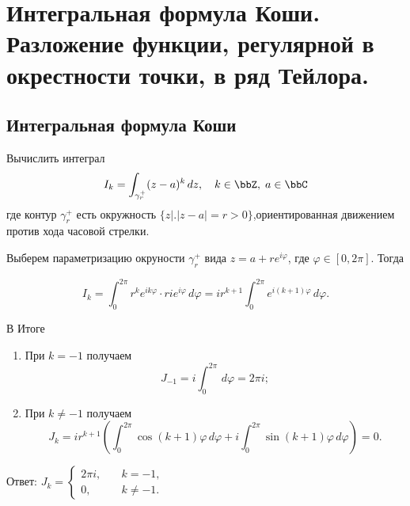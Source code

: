 \chapter{Интегральная формула Коши. Разложение функции, регулярной в окрестности точки, в ряд Тейлора.}
\section{Интегральная формула Коши}

\begin{exmpl}
\label{exmpl1}
Вычислить интеграл 
$$
I_k = \int_{\gamma_r^+} (z-a)^k\,dz, \quad k \in \bbZ, \; a\in \bbC
$$
где контур $\gamma_r^+$ есть окружность $\{ z \bigl|\bigr. |z - a| = r>0 \}$,ориентированная движением против хода часовой стрелки.
\end{exmpl}
\begin{solution}
Выберем параметризацию окруности $\gamma_r^+$ вида $z = a + r e^{i \varphi}$, где $\varphi \in [0, 2\pi]$. Тогда

$$
I_k = \int_{0}^{2 \pi} r^k e^{i k \varphi} \cdot r i e^{i \varphi} \,d\varphi = i r^{k+1} \int_{0}^{2 \pi} e^{i (k + 1) \varphi}\,d\varphi.
$$

В Итоге
\begin{enumerate}
\item
При $k = -1$ получаем $$J_{-1} = i \int_{0}^{2\pi}\,d\varphi = 2 \pi i;$$
\item
При $k \ne -1$ получаем
$$
J_k = i r^{k + 1} \left( \int_{0}^{2 \pi} \cos(k + 1) \varphi \,d \varphi + i \int_{0}^{2 \pi} \sin(k + 1) \varphi \,d\varphi \right) = 0.
$$
\end{enumerate}
Ответ: $J_k=\begin{cases}2\pi i, \quad &k=-1,\\0, \quad &k\ne -1. 
\end{cases}$\qedhere
\end{solution}

